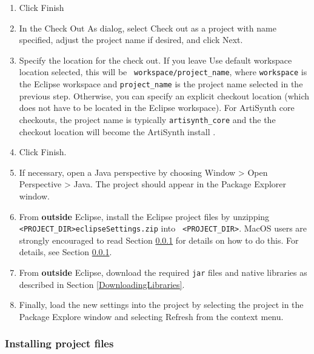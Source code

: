 \begin{enumerate}
\item Click {\sf Finish}

\item In the {\sf Check Out As} dialog, select {\sf Check out as a
project with name specified}, adjust the project name if desired,
and click {\sf Next}.

\item Specify the location for the check out. If you leave {\sf Use
default workspace location} selected, this will be {\tt
workspace/project\_name}, where {\tt workspace} is the Eclipse
workspace \directory{} and {\tt project\_name} is the project name
selected in the previous step. Otherwise, you can specify an explicit
checkout location (which does not have to be located in the Eclipse
workspace). For ArtiSynth core checkouts, the project name is
typically {\tt artisynth\_core} and the the checkout location will
become the ArtiSynth install \directory{} \ArtHome[].

\item Click {\sf Finish}.

\item If necessary, open a Java perspective by choosing {\sf Window >
Open Perspective > Java}. The project should appear in the {\sf
Package Explorer} window.

\item From {\bf outside} Eclipse, install the Eclipse project files by
unzipping {\tt <PROJECT\_DIR>\SEP eclipse\-Settings.zip} into {\tt
<PROJECT\_DIR>}. 
\ifMacOS
MacOS users are strongly encouraged to read  
Section \ref{installingProjectFiles} for details on how to do this.
\else
For details, see Section \ref{installingProjectFiles}.
\fi

\item From {\bf outside} Eclipse, download
the required {\tt jar}
files and native libraries as described in Section \ref{DownloadingLibraries}.

\item Finally, load the new settings into the project by selecting the
project in the {\sf Package Explore} window and selecting {\sf
Refresh} from the context menu.

\end{enumerate}

\subsubsection{Installing project files}
\label{installingProjectFiles}

